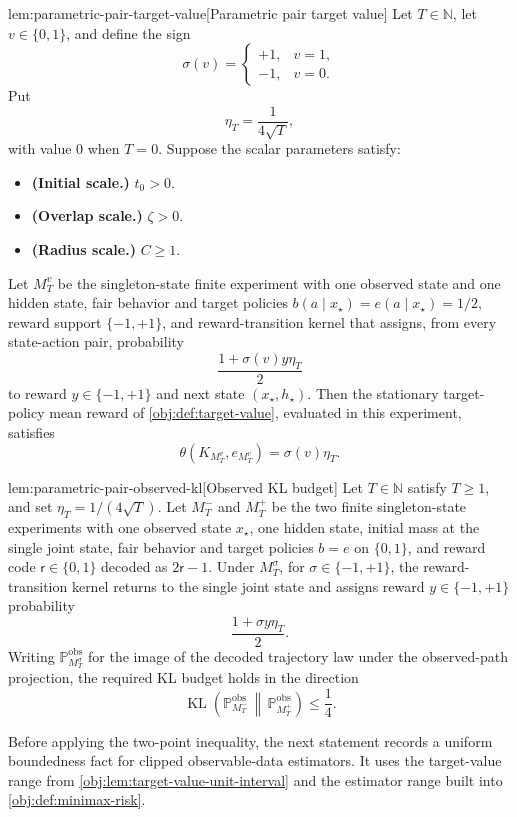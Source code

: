 \begin{lemmav}{lem:parametric-pair-target-value}[Parametric pair target value]
Let \(T\in\mathbb N\), let \(v\in\{0,1\}\), and define the sign
\[
\sigma(v)=
\begin{cases}
+1, & v=1,\\
-1, & v=0.
\end{cases}
\]
Put
\[
\eta_T=\frac{1}{4\sqrt T},
\]
with value \(0\) when \(T=0\). Suppose the scalar parameters satisfy:
\begin{itemize}
\item \textbf{(Initial scale.)} \(t_0>0\).
\item \textbf{(Overlap scale.)} \(\zeta>0\).
\item \textbf{(Radius scale.)} \(C\ge 1\).
\end{itemize}
Let \(M_T^v\) be the singleton-state finite experiment with one observed state and one hidden state, fair behavior and target policies \(b(a\mid x_\star)=e(a\mid x_\star)=1/2\), reward support \(\{-1,+1\}\), and reward-transition kernel that assigns, from every state-action pair, probability
\[
\frac{1+\sigma(v)y\eta_T}{2}
\]
to reward \(y\in\{-1,+1\}\) and next state \((x_\star,h_\star)\). Then the stationary target-policy mean reward of \cref{obj:def:target-value}, evaluated in this experiment, satisfies
\[
\theta(K_{M_T^v},e_{M_T^v})=\sigma(v)\eta_T .
\]
\end{lemmav}

\begin{lemmav}{lem:parametric-pair-observed-kl}[Observed KL budget]
Let \(T\in\mathbb N\) satisfy \(T\ge 1\), and set \(\eta_T=1/(4\sqrt T)\). Let \(M_T^{-}\) and \(M_T^{+}\) be the two finite singleton-state experiments with one observed state \(x_\star\), one hidden state, initial mass at the single joint state, fair behavior and target policies \(b=e\) on \(\{0,1\}\), and reward code \(\mathsf r\in\{0,1\}\) decoded as \(2\mathsf r-1\). Under \(M_T^\sigma\), for \(\sigma\in\{-1,+1\}\), the reward-transition kernel returns to the single joint state and assigns reward \(y\in\{-1,+1\}\) probability
\[
\frac{1+\sigma y\eta_T}{2}.
\]
Writing \(\mathbb P^{\mathrm{obs}}_{M_T^\sigma}\) for the image of the decoded trajectory law under the observed-path projection, the required KL budget holds in the direction
\[
\operatorname{KL}\!\left(
\mathbb P^{\mathrm{obs}}_{M_T^-}
\,\middle\|\,
\mathbb P^{\mathrm{obs}}_{M_T^+}
\right)
\le \frac14 .
\]
\end{lemmav}

Before applying the two-point inequality, the next statement records a uniform boundedness fact for clipped observable-data estimators. It uses the target-value range from \cref{obj:lem:target-value-unit-interval} and the estimator range built into \cref{obj:def:minimax-risk}.

